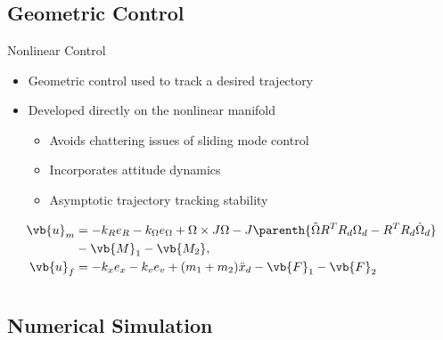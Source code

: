 \documentclass[11pt,professionalfonts]{beamer}
\begin{document}
\section*{}
\subsection*{Geometric Control}
\begin{frame}{Nonlinear Control}
    \begin{itemize}
        \item Geometric control used to track a desired trajectory
        \item Developed directly on the nonlinear manifold
            \begin{itemize}
                \item Avoids chattering issues of sliding mode control
                \item Incorporates attitude dynamics
                \item Asymptotic trajectory tracking stability
            \end{itemize}
    \end{itemize}

\pause
\begin{align*}
    \vb{u}_m &= - k_R e_R - k_\Omega e_\Omega + \Omega \times J \Omega - J \parenth{\hat{\Omega} R^T R_d \Omega_d - R^T R_d \dot{\Omega}_d}  \\
             &- \vb{M}_1 - \vb{M_2} , \\
    \vb{u}_f &= - k_x e_x  - k_v e_v + ( m_1  + m_2 ) \ddot{x}_d - \vb{F}_1 - \vb{F}_2 
\end{align*}
\end{frame}



\section*{}
\subsection*{Numerical Simulation}
\end{document}
